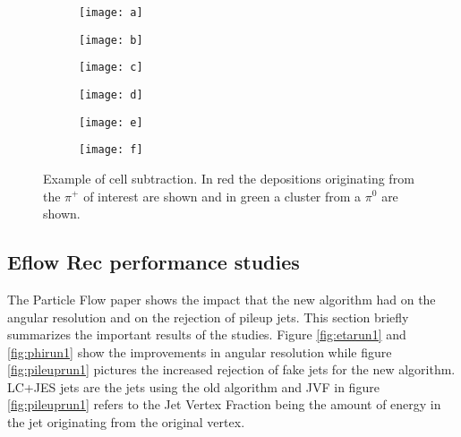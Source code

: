 \begin{figure}[htbp]
  \centering
  \begin{subfigure}[b]{0.3\figwidth}
    \texttt{[image: a]}
    \caption{}\label{fig:sub-a}
  \end{subfigure}
  \begin{subfigure}[b]{0.3\figwidth}
    \texttt{[image: b]}
    \caption{}\label{fig:sub-b}
  \end{subfigure}
  \begin{subfigure}[b]{0.3\figwidth}
    \texttt{[image: c]}
    \caption{}\label{fig:sub-c}
  \end{subfigure}
  \begin{subfigure}[b]{0.3\figwidth}
    \texttt{[image: d]}
    \caption{}\label{fig:sub-d}
  \end{subfigure}
    
    
  \begin{subfigure}[b]{0.3\figwidth}
        \texttt{[image: e]}
        \caption{}\label{fig:sub-e}
  \end{subfigure}
  \begin{subfigure}[b]{0.3\figwidth}
        \texttt{[image: f]}
        \caption{}\label{fig:sub-f}
  \end{subfigure}
  \caption{Example of cell subtraction. In red the depositions originating from the $\pi ^+$ of interest are shown and in green a cluster from a $\pi ^0$ are shown. \cite{pflow16}}
  \label{fig:sub}
\end{figure}


\subsection{Eflow Rec performance studies}

The Particle Flow paper shows the impact that the new algorithm had on the angular resolution and on the rejection of pileup jets. This section briefly summarizes the important results of the studies. Figure \ref{fig:etarun1} and \ref{fig:phirun1} show the improvements in angular resolution while figure \ref{fig:pileuprun1} pictures the increased rejection of fake jets for the new algorithm. LC+JES jets are the jets using the old algorithm and JVF in figure \ref{fig:pileuprun1} refers to the Jet Vertex Fraction being the amount of energy in the jet originating from the original vertex.

